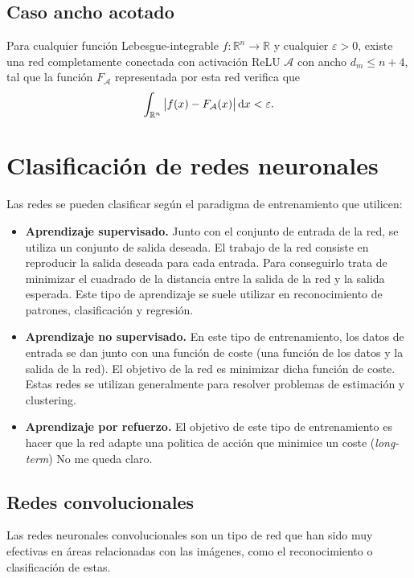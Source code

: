 \documentclass[
  a4paper,
  12pt,
  spanish,
]{scrartcl}
\theoremstyle{teorema-style}
\begin{document}
\subsection{Caso ancho acotado}

Para cualquier función Lebesgue-integrable $f: \mathbb{R}^n \rightarrow \mathbb{R}$ y cualquier $\varepsilon >0$, existe una red completamente conectada con activación ReLU \(\mathcal A\) con ancho $d_m \leq n+4$, tal que la función $F_{\mathcal A}$ representada por esta red verifica que
\[
  \displaystyle \int_{\mathbb{R}^{n}}\left|f(x)-F_{\mathcal A}(x)\right|\dif x < \varepsilon.
\]

\section{Clasificación de redes neuronales}
Las redes se pueden clasificar según el paradigma de entrenamiento que utilicen:

\begin{itemize}
\item \textbf{Aprendizaje supervisado. } Junto con el conjunto de entrada de la
  red, se utiliza un conjunto de salida deseada. El trabajo de la red consiste
  en reproducir la salida deseada para cada entrada. Para conseguirlo trata de
  minimizar el cuadrado de la distancia entre la salida de la red y la salida
  esperada. Este tipo de aprendizaje se suele utilizar en reconocimiento de
  patrones, clasificación y regresión.
\item \textbf{Aprendizaje no supervisado. } En este tipo de entrenamiento, los
  datos de entrada se dan junto con una función de coste (una función de los
  datos y la salida de la red). El objetivo de la red es minimizar dicha función
  de coste. Estas redes se utilizan generalmente para resolver problemas de
  estimación y clustering.
\item \textbf{Aprendizaje por refuerzo. } El objetivo de este tipo de
  entrenamiento es hacer que la red adapte una politica de acción que minimice
  un coste (\textit{long-term}) No me queda claro.
\end{itemize}

\subsection{Redes convolucionales}%
\label{sub:redes_convolucionales}

Las redes neuronales convolucionales son un tipo de red que han sido muy efectivas en áreas relacionadas con las imágenes, como el reconocimiento o clasificación de estas.
\end{document}
